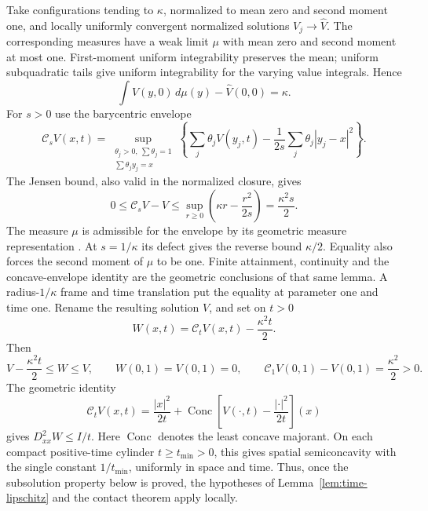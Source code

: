 Take configurations tending to $\kappa$, normalized to mean zero and
second moment one, and locally uniformly convergent normalized
solutions $V_j\to\widehat V$. The corresponding measures have a weak
limit $\mu$ with mean zero and second moment at most one. First-moment
uniform integrability preserves the mean; uniform subquadratic tails
give uniform integrability for the varying value integrals. Hence
\[
 \int\widehat V(y,0)\,d\mu(y)-\widehat V(0,0)=\kappa.
\]
For $s>0$ use the barycentric envelope
\[
 \mathcal C_sV(x,t)=
 \sup_{\substack{\theta_j>0,\ \sum\theta_j=1\\
                   \sum\theta_jy_j=x}}
 \left\{\sum_j\theta_jV(y_j,t)
              -\frac1{2s}\sum_j\theta_j|y_j-x|^2\right\}.
\]
The Jensen bound, also valid in the normalized closure, gives
\begin{equation}\label{eq:envelope-sandwich}
 0\leq\mathcal C_sV-V\leq
 \sup_{r\geq0}\left(\kappa r-\frac{r^2}{2s}\right)
 =\frac{\kappa^2s}{2}.
\end{equation}
The measure $\mu$ is admissible for the envelope by its geometric
measure representation \cite[Section 5]{OpenAI}. At $s=1/\kappa$
its defect gives the reverse bound $\kappa/2$. Equality also forces
the second moment of $\mu$ to be one. Finite attainment, continuity
and the concave-envelope identity are the geometric conclusions of
that same lemma. A radius-$1/\kappa$ frame and time translation put
the equality at parameter one and time one. Rename the resulting
solution $V$, and set on $t>0$
\[
 W(x,t)=\mathcal C_tV(x,t)-\frac{\kappa^2t}{2}.
\]
Then
\begin{equation}\label{eq:extremal-contact}
 V-\frac{\kappa^2t}{2}\leq W\leq V,\qquad
 W(0,1)=V(0,1)=0,\qquad
 \mathcal C_1V(0,1)-V(0,1)=\frac{\kappa^2}{2}>0.
\end{equation}
The geometric identity
\[
 \mathcal C_tV(x,t)=\frac{|x|^2}{2t}
  +\operatorname{Conc}\left[V(\cdot,t)-\frac{|\cdot|^2}{2t}\right](x)
\]
gives $D^2_{xx}W\leq I/t$. Here $\operatorname{Conc}$ denotes the
least concave majorant. On each compact positive-time cylinder
$t\geq t_{\min}>0$, this gives spatial semiconcavity with the
single constant $1/t_{\min}$, uniformly in space and time. Thus,
once the subsolution property below is proved, the hypotheses of
Lemma~\ref{lem:time-lipschitz} and the contact theorem apply locally.

